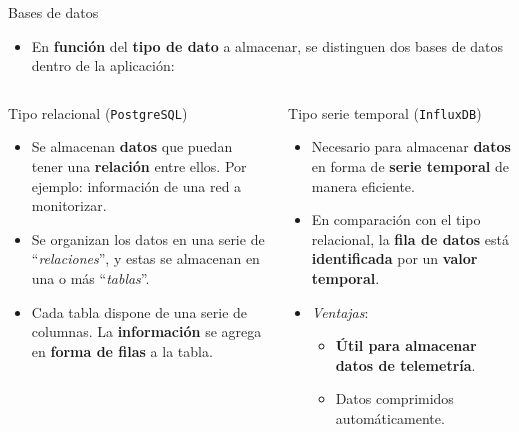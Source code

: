 \documentclass[aspectratio=169,xcolor=dvipsnames]{beamer}
\begin{document}
	
	\begin{frame}{Bases de datos}
		
		\begin{itemize}
			\item En \textbf{función} del \textbf{tipo de dato} a almacenar, se distinguen dos bases de datos dentro de la aplicación:
		\end{itemize}
		
		\begin{columns}
			\begin{column}{0.5\textwidth}
				\begin{block}{Tipo relacional (\texttt{PostgreSQL})}
					\begin{itemize}
						\item Se almacenan \textbf{datos} que puedan tener una \textbf{relación} entre ellos. Por ejemplo: información de una red a monitorizar.
						
						\item Se organizan los datos en una serie de ``\textit{relaciones}'', y estas se almacenan en una o más ``\textit{tablas}''.
						
						\item Cada tabla dispone de una serie de columnas. La \textbf{información} se agrega en \textbf{forma de filas} a la tabla.
					\end{itemize}
				\end{block}
			\end{column}
			
			
			\begin{column}{0.5\textwidth}
				\begin{block}{Tipo serie temporal (\texttt{InfluxDB})}
					\begin{itemize}
						\item Necesario para almacenar \textbf{datos} en forma de \textbf{serie temporal} de manera eficiente.
						
						\item En comparación con el tipo relacional, la \textbf{fila de datos} está \textbf{identificada} por un \textbf{valor temporal}.
						
						\item \textit{Ventajas}:
						\begin{itemize}
							\item \textbf{Útil para almacenar datos de telemetría}.
							\item Datos comprimidos automáticamente.
						\end{itemize}
					\end{itemize}
				\end{block}
			\end{column}
		\end{columns}
	\end{frame}
	
\end{document}
